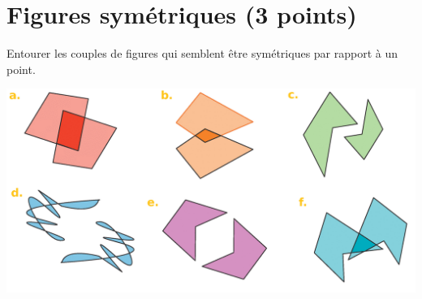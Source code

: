 \section{Figures symétriques (3 points)}

\begin{questions}
	\question[3] Entourer les couples de figures qui semblent être symétriques par rapport à un point.
\end{questions}


\begin{center}
	\includegraphics[scale=0.4]{img/figures}
\end{center} 